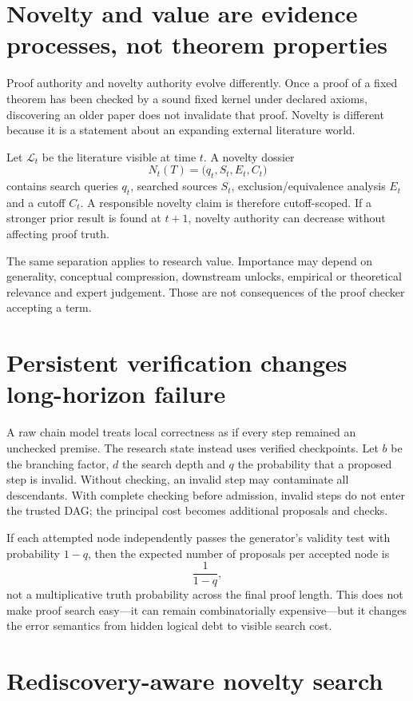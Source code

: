 \documentclass[11pt]{article}
\begin{document}
\section{Novelty and value are evidence processes, not theorem properties}

Proof authority and novelty authority evolve differently. Once a proof of a fixed theorem has been checked by a sound fixed kernel under declared axioms, discovering an older paper does not invalidate that proof. Novelty is different because it is a statement about an expanding external literature world.

Let $\mathcal L_t$ be the literature visible at time $t$. A novelty dossier
\[
N_t(T)=\bigl(q_t,S_t,E_t,C_t\bigr)
\]
contains search queries $q_t$, searched sources $S_t$, exclusion/equivalence analysis $E_t$ and a cutoff $C_t$. A responsible novelty claim is therefore cutoff-scoped. If a stronger prior result is found at $t+1$, novelty authority can decrease without affecting proof truth.

The same separation applies to research value. Importance may depend on generality, conceptual compression, downstream unlocks, empirical or theoretical relevance and expert judgement. Those are not consequences of the proof checker accepting a term.

\section{Persistent verification changes long-horizon failure}

A raw chain model treats local correctness as if every step remained an unchecked premise. The research state instead uses verified checkpoints. Let $b$ be the branching factor, $d$ the search depth and $q$ the probability that a proposed step is invalid. Without checking, an invalid step may contaminate all descendants. With complete checking before admission, invalid steps do not enter the trusted DAG; the principal cost becomes additional proposals and checks.

If each attempted node independently passes the generator's validity test with probability $1-q$, then the expected number of proposals per accepted node is
\[
\frac{1}{1-q},
\]
not a multiplicative truth probability across the final proof length. This does not make proof search easy---it can remain combinatorially expensive---but it changes the error semantics from hidden logical debt to visible search cost.

\section{Rediscovery-aware novelty search}
\end{document}
